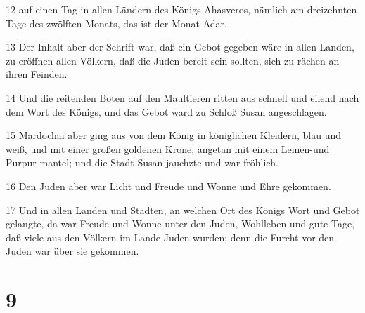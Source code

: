 \par 12 auf einen Tag in allen Ländern des Königs Ahasveros, nämlich am dreizehnten Tage des zwölften Monats, das ist der Monat Adar.
\par 13 Der Inhalt aber der Schrift war, daß ein Gebot gegeben wäre in allen Landen, zu eröffnen allen Völkern, daß die Juden bereit sein sollten, sich zu rächen an ihren Feinden.
\par 14 Und die reitenden Boten auf den Maultieren ritten aus schnell und eilend nach dem Wort des Königs, und das Gebot ward zu Schloß Susan angeschlagen.
\par 15 Mardochai aber ging aus von dem König in königlichen Kleidern, blau und weiß, und mit einer großen goldenen Krone, angetan mit einem Leinen-und Purpur-mantel; und die Stadt Susan jauchzte und war fröhlich.
\par 16 Den Juden aber war Licht und Freude und Wonne und Ehre gekommen.
\par 17 Und in allen Landen und Städten, an welchen Ort des Königs Wort und Gebot gelangte, da war Freude und Wonne unter den Juden, Wohlleben und gute Tage, daß viele aus den Völkern im Lande Juden wurden; denn die Furcht vor den Juden war über sie gekommen.

\chapter{9}


